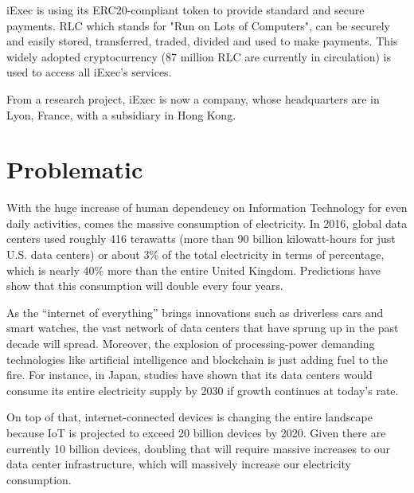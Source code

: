   iExec is using its ERC20-compliant token to provide standard and secure payments. RLC which stands for
  "Run on Lots of Computers", can be securely and easily stored, transferred, traded, divided and used
  to make payments. This widely adopted cryptocurrency (87 million RLC are currently in circulation)
  is used to access all iExec's services.

  From a research project, iExec is now a company, whose headquarters are in Lyon, France, with a
  subsidiary in Hong Kong.

\section{Problematic}
  With the huge increase of human dependency on Information Technology for even daily activities,
  comes the massive consumption of electricity. In 2016, global data centers used roughly 416
  terawatts (more than 90 billion kilowatt-hours for just U.S. data centers) or about 3\% of the
  total electricity in terms of percentage, which is nearly 40\% more than the entire United Kingdom.
  Predictions have show that this consumption will double every four years.

  As the “internet of everything” brings innovations such as driverless cars and smart watches,
  the vast network of data centers that have sprung up in the past decade will spread. Moreover,
  the explosion of processing-power demanding technologies like artificial intelligence and
  blockchain is just adding fuel to the fire. For instance, in Japan, studies have shown that
  its data centers would consume its entire electricity supply by 2030 if growth continues at
  today's rate.

  On top of that, internet-connected devices is changing the entire landscape because IoT is
  projected to exceed 20 billion devices by 2020. Given there are currently 10 billion devices,
  doubling that will require massive increases to our data center infrastructure, which will
  massively increase our electricity consumption.


